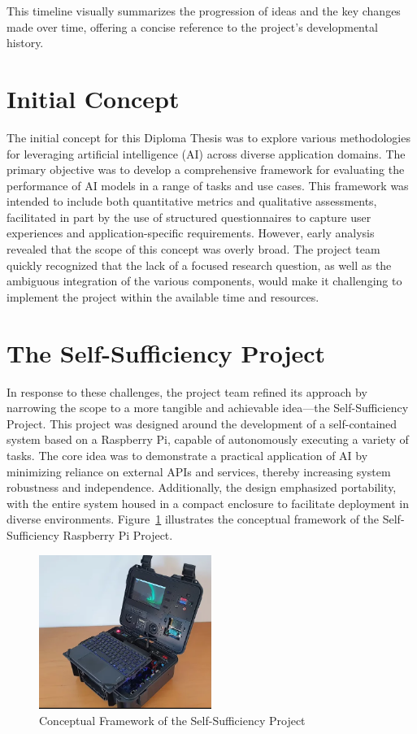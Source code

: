 This timeline visually summarizes the progression of ideas and the key changes made over time, offering a concise reference to the project's developmental history.

\section{Initial Concept}

The initial concept for this Diploma Thesis was to explore various methodologies for leveraging artificial intelligence (AI) across diverse application domains. The primary objective was to develop a comprehensive framework for evaluating the performance of AI models in a range of tasks and use cases. This framework was intended to include both quantitative metrics and qualitative assessments, facilitated in part by the use of structured questionnaires to capture user experiences and application-specific requirements. However, early analysis revealed that the scope of this concept was overly broad. The project team quickly recognized that the lack of a focused research question, as well as the ambiguous integration of the various components, would make it challenging to implement the project within the available time and resources.

\section{The Self-Sufficiency Project}

In response to these challenges, the project team refined its approach by narrowing the scope to a more tangible and achievable idea—the Self-Sufficiency Project. This project was designed around the development of a self-contained system based on a Raspberry Pi, capable of autonomously executing a variety of tasks. The core idea was to demonstrate a practical application of AI by minimizing reliance on external APIs and services, thereby increasing system robustness and independence. Additionally, the design emphasized portability, with the entire system housed in a compact enclosure to facilitate deployment in diverse environments. Figure~\ref{fig:SelfSufficiencyProject} illustrates the conceptual framework of the Self-Sufficiency Raspberry Pi Project.

\begin{figure}[H]
    \centering
    \includegraphics[width=0.5\textwidth]{figures/SAIPIA-concept-picture.png}
    \caption{Conceptual Framework of the Self-Sufficiency Project}
    \label{fig:SelfSufficiencyProject}
\end{figure}


